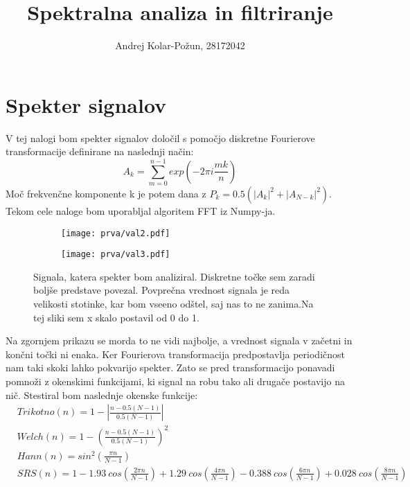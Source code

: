 \documentclass{article}
\title{Spektralna analiza in filtriranje}
\author{Andrej Kolar-Požun, 28172042}
\begin{document}
\maketitle
\newpage
{}
\section{Spekter signalov}

V tej nalogi bom spekter signalov določil s pomočjo diskretne Fourierove transformacije definirane na naslednji način:
\begin{equation*}
A_k = \sum_{m=0}^{n-1} exp(-2\pi i \frac{m k}{n})
\end{equation*}
Moč frekvenčne komponente k je potem dana z $P_k = 0.5(|A_k|^2 + |A_{N-k}|^2)$. 
Tekom cele naloge bom uporabljal algoritem FFT iz Numpy-ja.
\begin{figure}[H]
\centering
\begin{subfigure}{.49\textwidth}
\texttt{[image: prva/val2.pdf]}
\end{subfigure}
\begin{subfigure}{.49\textwidth}
\texttt{[image: prva/val3.pdf]}
\end{subfigure}
\caption*{Signala, katera spekter bom analiziral. Diskretne točke sem zaradi boljše predstave povezal. Povprečna vrednost signala je reda velikosti stotinke, kar bom vseeno odštel, saj nas to ne zanima.Na tej sliki sem x skalo postavil od 0 do 1.}
\end{figure}

Na zgornjem prikazu se morda to ne vidi najbolje, a vrednost signala v začetni in končni točki ni enaka. Ker Fourierova transformacija predpostavlja periodičnost nam taki skoki lahko pokvarijo spekter. Zato se pred transformacijo ponavadi pomnoži z okenskimi funkcijami, ki signal na robu tako ali drugače postavijo na nič.
Stestiral bom naslednje okenske funkcije:
\begin{align*}
&Trikotno(n) = 1 - \left|\frac{n - 0.5(N-1)}{0.5 (N-1)}\right|  \\
&Welch(n) = 1 - \left(\frac{n-0.5(N-1)}{0.5(N-1)}\right) ^2 \\
&Hann(n) = sin^2 \left( \frac{\pi n}{N-1} \right) \\
&SRS(n) = 1 - 1.93 \ cos\left( \frac{2\pi n}{N-1} \right) + 1.29 \ cos\left( \frac{4\pi n}{N-1} \right) - 0.388 \ cos\left( \frac{6\pi n}{N-1} \right) + 0.028 \ cos\left( \frac{8\pi n}{N-1} \right)
\end{align*}
\end{document}
